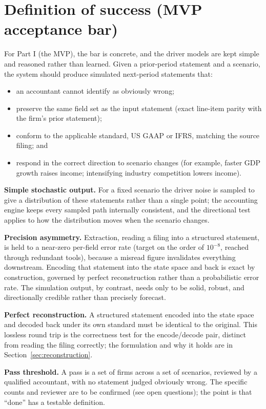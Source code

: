 \documentclass[11pt]{article}
\newcommand{\lead}[2]{\par\addvspace{5pt}\textbf{\textcolor{#1}{#2}}}
\begin{document}
\section{Definition of success (MVP acceptance bar)}
For Part I (the MVP), the bar is concrete, and the driver models are kept simple and reasoned rather than learned. Given a prior-period statement and a scenario, the system should produce simulated next-period statements that:
\begin{itemize}
  \item an accountant cannot identify as obviously wrong;
  \item preserve the same field set as the input statement (exact line-item parity with the firm's prior statement);
  \item conform to the applicable standard, US GAAP or IFRS, matching the source filing; and
  \item respond in the correct direction to scenario changes (for example, faster GDP growth raises income; intensifying industry competition lowers income).
\end{itemize}
\lead{navytwo}{Simple stochastic output.} For a fixed scenario the driver noise is sampled to give a distribution of these statements rather than a single point; the accounting engine keeps every sampled path internally consistent, and the directional test applies to how the distribution moves when the scenario changes.
\lead{navytwo}{Precision asymmetry.} Extraction, reading a filing into a structured statement, is held to a near-zero per-field error rate (target on the order of $10^{-8}$, reached through redundant tools), because a misread figure invalidates everything downstream. Encoding that statement into the state space and back is exact by construction, governed by perfect reconstruction rather than a probabilistic error rate. The simulation output, by contrast, needs only to be solid, robust, and directionally credible rather than precisely forecast.

\lead{navytwo}{Perfect reconstruction.} A structured statement encoded into the state space and decoded back under its own standard must be identical to the original. This lossless round trip is the correctness test for the encode/decode pair, distinct from reading the filing correctly; the formulation and why it holds are in Section~\ref{sec:reconstruction}.

\lead{navytwo}{Pass threshold.} A pass is a set of firms across a set of scenarios, reviewed by a qualified accountant, with no statement judged obviously wrong. The specific counts and reviewer are to be confirmed (see open questions); the point is that ``done'' has a testable definition.
\end{document}
